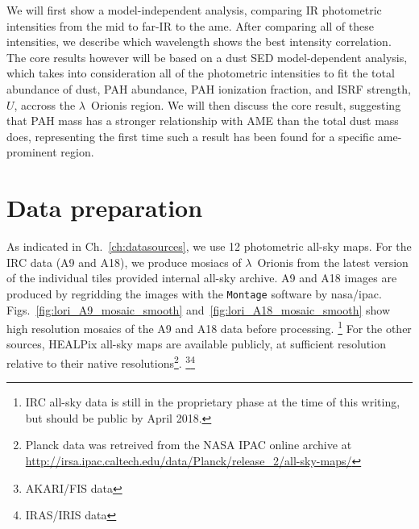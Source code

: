     We will first show a model-independent analysis, comparing IR photometric intensities from the mid to far-IR to the \gls{ame}. After comparing all of these intensities, we describe which wavelength shows the best intensity correlation. The core results however will be based on a dust SED model-dependent analysis, which takes into consideration all of the photometric intensities to fit the total abundance of dust, PAH abundance, PAH ionization fraction, and ISRF strength, $U$, accross the $\lambda$~Orionis region. We will then discuss the core result, suggesting that PAH mass has a stronger relationship with AME than the total dust mass does, representing the first time such a result has been found for a specific \gls{ame}-prominent region.

	\section{Data preparation}
    \label{sec:dataprocessing}
		As indicated in Ch.~\ref{ch:datasources}, we use 12 photometric all-sky maps. For the IRC data (A9 and A18), we produce mosiacs of $\lambda$~Orionis from the latest version of the individual tiles provided internal all-sky archive. A9 and A18 images are produced by regridding the images with the {\tt Montage} software by \gls{nasa}/\gls{ipac}. Figs.~\ref{fig:lori_A9_mosaic_smooth} and~\ref{fig:lori_A18_mosaic_smooth} show high resolution mosaics of the A9 and A18 data before processing.
      \footnote{IRC all-sky data is still in the proprietary phase at the time of this writing, but should be public by April 2018.}
       For the other sources, HEALPix all-sky maps are available publicly, at sufficient resolution relative to their native resolutions\footnote{Planck data was retreived from the NASA IPAC online archive at \url{http://irsa.ipac.caltech.edu/data/Planck/release_2/all-sky-maps/}}. \footnote{AKARI/FIS data }\footnote{IRAS/IRIS data }

